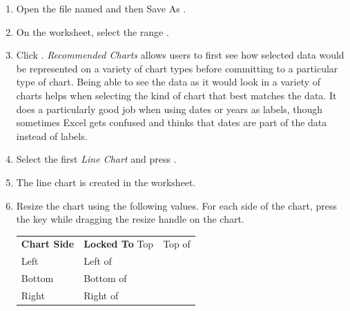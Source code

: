 \begin{enumbox}
	\begin{enumerate}
		\item Open the file named  and then Save As .
		\item On the  worksheet, select the range .
		\item Click . \textit{Recommended Charts} allows users to first see how selected data would be represented on a variety of chart types before committing to a particular type of chart. Being able to see the data as it would look in a variety of charts helps when selecting the kind of chart that best matches the data. It does a particularly good job when using dates or years as labels, though sometimes Excel gets confused and thinks that dates are part of the data instead of labels.
		\item Select the first \textit{Line Chart} and press .
		\item The line chart is created in the  worksheet.
		\item Resize the chart using the following values. For each side of the chart, press the  key while dragging the resize handle on the chart.
	
		\begin{table}[H]
		\captionsetup{labelformat=empty} %
		{\small
			\begin{longtable}{R{0.75in}L{1.50in}} %
				\textbf{Chart Side} & \textbf{Locked To} \endhead
				\hline
				Top & Top of \\
				Left & Left of \\
				Bottom & Bottom of \\
				Right & Right of \\
			\end{longtable}
		} %
		\end{table}
	

\end{enumerate}
\end{enumbox}
